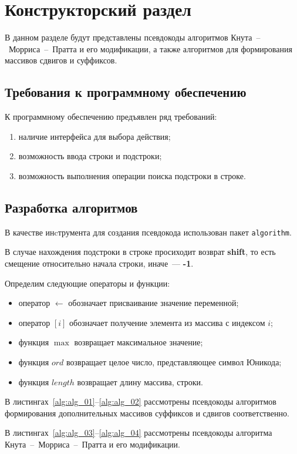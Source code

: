 \chapter{Конструкторский раздел}
В данном разделе будут представлены псевдокоды алгоритмов Кнута~--~Морриса~--~Пратта и его модификации, а также алгоритмов для формирования массивов сдвигов и суффиксов.

\section{Требования к программному обеспечению}
К программному обеспечению предъявлен ряд требований:
\begin{enumerate}
	\item наличие интерфейса для выбора действия;
	\item возможность ввода строки и подстроки;
	\item возможность выполнения операции поиска подстроки в строке.
\end{enumerate}

\section{Разработка алгоритмов}
В качестве инcтрумента для создания псевдокода использован пакет \texttt{algorithm}.

В случае нахождения подстроки в строке просиходит возврат \textbf{shift}, то есть смещение относительно начала строки, иначе~--- \textbf{-1}. 

Определим следующие операторы и функции:
\begin{itemize}
	\item оператор $\gets$ обозначает присваивание значение переменной;
	\item оператор $[i]$ обозначает получение элемента из массива с индексом $i$;
	\item функция $\max$ возвращает максимальное значение;
	\item функция $ord$ возвращает целое число, представляющее символ Юникода;
	\item функция $length$ возвращает длину массива, строки.
\end{itemize}

В листингах~\ref{alg:alg_01}--\ref{alg:alg_02} рассмотрены псевдокоды алгоритмов формирования дополнительных массивов суффиксов и сдвигов соответственно. 

В листингах~\ref{alg:alg_03}--\ref{alg:alg_04} рассмотрены псевдокоды алгоритма Кнута~--~Морриса~--~Пратта и его модификации. 

